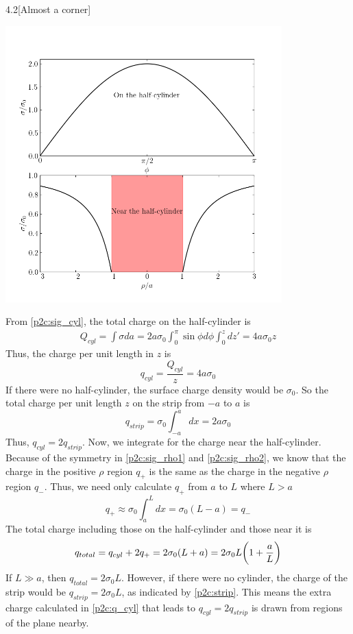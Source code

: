 \documentclass[12pt]{article}
\begin{document}
\begin{problem}{4.2}[Almost a corner]
\begin{solution}
\begin{center}
    \includegraphics[width=0.8\textwidth]{p2.png}
\end{center}
From \eqref{p2c:sig_cyl}, the total charge on the half-cylinder is
\begin{align}
    Q_{cyl}=\int\sigma da=2a\sigma_0\int_0^\pi\sin\phi
    d\phi\int_0^zdz'=4a\sigma_0z
\end{align}
Thus, the charge per unit length in $z$ is
\begin{equation}\label{p2c:q_cyl}
    q_{cyl}=\frac{Q_{cyl}}{z}=4a\sigma_0 
\end{equation}
If there were no half-cylinder, the surface charge density would be $\sigma_0$.
So the total charge per unit length $z$ on the strip from $-a$ to $a$ is
\begin{equation}\label{p2c:strip}
    q_{strip}=\sigma_0\int_{-a}^adx=2a\sigma_0 
\end{equation}
Thus, $q_{cyl}=2q_{strip}$. Now, we integrate for the charge near the
half-cylinder. Because of the symmetry in \eqref{p2c:sig_rho1} and
\eqref{p2c:sig_rho2}, we know that the charge in the positive $\rho$ region
$q_+$ is the same as the charge in the negative $\rho$ region $q_-$. Thus, we
need only calculate $q_+$ from $a$ to $L$ where $L>a$
\begin{equation}
    q_+\approx\sigma_0\int_a^Ldx=\sigma_0(L-a)=q_- 
\end{equation}
The total charge including those on the half-cylinder and those near it is
\begin{equation}
    q_{total}=q_{cyl}+2q_+=2\sigma_0(L+a)=2\sigma_0L\qty(1+\frac{a}{L}) 
\end{equation}
If $L\gg a$, then $q_{total}=2\sigma_0L$. However, if there were no cylinder,
the charge of the strip would be $q_{strip}=2\sigma_0L$, as indicated by 
\eqref{p2c:strip}. This means the extra charge calculated in \eqref{p2c:q_cyl}
that leads to $q_{cyl}=2q_{strip}$ is drawn from regions of the plane nearby.
\end{solution}
\end{problem}
\end{document}
